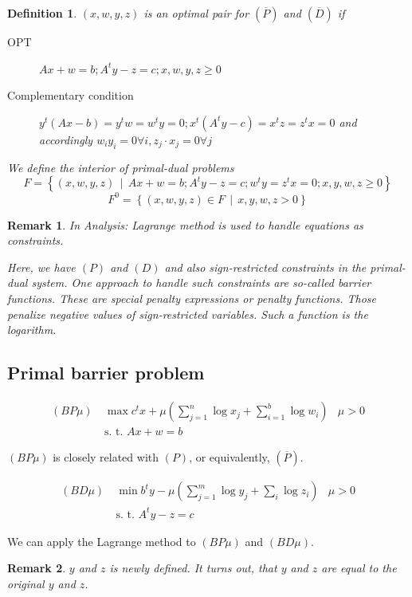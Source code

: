 \documentclass[a4paper]{article}
\numberwithin{lecref}{section}
\newtheorem*{Definition}{Definition}
\newtheorem*{Remark}{Remark}
\newcommand{\SetDef}[2]{\left\{#1\,\mid\,#2\right\}}
\begin{document}
\begin{Definition}
	$(x, w, y, z)$ is an optimal pair for $(\overline P)$ and $(\overline D)$ if
	\begin{description}
		\item[OPT] $Ax + w = b; A^t y - z = c; x, w, y, z \geq 0$
		\item[Complementary condition] $y^t (Ax - b) = y^t w = w^t y = 0; x^t (A^t y - c) = x^t z = z^t x = 0$ and accordingly $w_i y_i = 0 \forall i, z_j \cdot x_j = 0 \forall j$
	\end{description}
	We define the interior of primal-dual problems
	\[ F = \SetDef{(x, w, y, z)}{Ax + w = b; A^t y - z = c; w^t y = z^t x = 0; x, y, w, z \geq 0} \]
	\[ F^0 = \SetDef{(x, w, y, z) \in F}{x, y, w, z > 0} \]
\end{Definition}

\begin{Remark}
	In Analysis: Lagrange method is used to handle equations as constraints.

	Here, we have $(P)$ and $(D)$ and also sign-restricted constraints in the primal-dual system.
	One approach to handle such constraints are so-called \emph{barrier functions}.
	These are special penalty expressions or penalty functions. Those penalize negative values of sign-restricted variables. Such a function is the logarithm.
\end{Remark}

\subsection{Primal barrier problem}

\begin{align*}
	(BP\mu) \: &\max c^t x + \mu \left(\sum_{j=1}^n \log x_j + \sum_{i=1}^b \log w_i\right) & \mu > 0 \\
    &\text{s. t. } Ax + w = b
\end{align*}

$(BP\mu)$ is closely related with $(P)$, or equivalently, $(\overline P)$. 

\begin{align*}
	(BD\mu) \: &\min b^t y - \mu \left(\sum_{j=1}^m \log y_j + \sum_i \log z_i\right) & \mu > 0 \\
	&\text{s. t. } A^t y - z = c
\end{align*}

We can apply the Lagrange method to $(BP\mu)$ and $(BD\mu)$.

\begin{Remark}
	$y$ and $z$ is newly defined. It turns out, that $y$ and $z$ are equal to the original $y$ and $z$.
\end{Remark}
\end{document}
